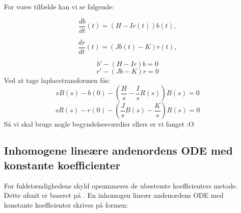 For vores tilfælde kan vi se følgende:

\begin{equation*}
    \dfrac{db}{dt}(t) = (H-Ir(t)) b(t), 
\end{equation*}

\begin{equation*}
    \dfrac{dr}{dt}(t) = (Jb(t)-K) r(t),
\end{equation*}

$$b' - (H - Ir)b = 0 $$
$$r' - (Jb - K)r = 0 $$
Ved at tage laplacetransformen fås:
$$sB(s) - b(0) - (\frac{H}{s} - \frac{I}{s}R(s))B(s) = 0$$
$$sR(s) - r(0) - (\frac{J}{s}B(s) - \frac{K}{s})R(s) = 0$$
Så vi skal bruge nogle begyndelsesværdier ellers er vi fanget :O



\subsection{Inhomogene lineære andenordens ODE med konstante koefficienter}\label{ila} 
For fuldstændighedens skyld opsummeres de ubestemte koefficienters metode. Dette afsnit er baseret på \citep[s. 240-246]{JAB}.\hfill \break
En inhomogen lineær andenordens ODE med konstante koefficienter skrives på formen:

